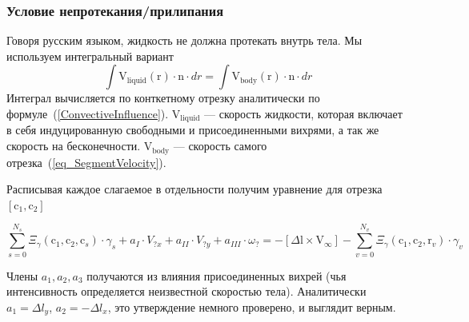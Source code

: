 \documentclass[14pt]{extreport}
\newcommand{\br}[1]{\boldsymbol{\mathrm{#1}}}
\renewcommand{\vec}[1]{\br{#1}}
\begin{document}
\subsubsection{Условие непротекания/прилипания}
\label{slau_noslip}

Говоря русским языком, жидкость не должна протекать внутрь тела. Мы используем интегральный вариант
\begin{equation}
\int{\vec V_\text{liquid}(\vec r) \cdot \vec n \cdot dr} = \int {\vec V_\text{body}(\vec r) \cdot \vec n \cdot dr}
\end{equation}
Интеграл вычисляется по конткетному отрезку аналитически по формуле~(\ref{ConvectiveInfluence}). $\br V_\text{liquid}$ --- скорость жидкости, которая включает в себя индуцированную свободными и присоединенными вихрями, а так же скорость на бесконечности. $\br V_\text{body}$ --- скорость самого отрезка~(\ref{eq_SegmentVelocity}).

Расписывая каждое слагаемое в отдельности получим уравнение для отрезка $[\vec c_1, \vec c_2]$

\begin{equation}
\label{eq_noslip}
\sum_{s=0}^{N_s} \Xi_\gamma(\vec c_1, \vec c_2, \vec c_s)\cdot \gamma_s
+ a_{I} \cdot V_{?x} + a_{II} \cdot V_{?y} + a_{III} \cdot \omega_?
=
-[\Delta \vec l \times \vec V_\infty] - \sum\limits_{v=0}^{N_v} \Xi_\gamma (\vec c_1, \vec c_2, \vec r_v) \cdot \gamma_v
\end{equation}


Члены $a_1, a_2, a_3$ получаются из влияния присоединенных вихрей (чья интенсивность определяется неизвестной скоростью тела). Аналитически $a_1 = \Delta l_y$, $a_2 = -\Delta l_x$, это утверждение немного проверено, и выглядит верным.
\end{document}
